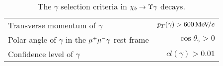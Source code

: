\begin{table}[H]
\caption{\small The $\gamma$ selection criteria in  $\chi_{{b}} \rightarrow \Upsilon \gamma$ decays.}
\centering
\begin{tabular}{lr}\toprule
Transverse momentum of $\gamma$ & $p_T(\gamma) > 600 {\mathrm{\,Me\kern -0.1em V\!/}c}$ \\
Polar angle of $\gamma$ in the ${\mu^+\mu^-}\gamma$ rest frame & $\cos\theta_{\gamma} > 0$ \\
Confidence level of $\gamma$ & $cl(\gamma) > 0.01$ \\
\bottomrule
\end{tabular}
\label{tab:chib:selection:photons}
\end{table}
